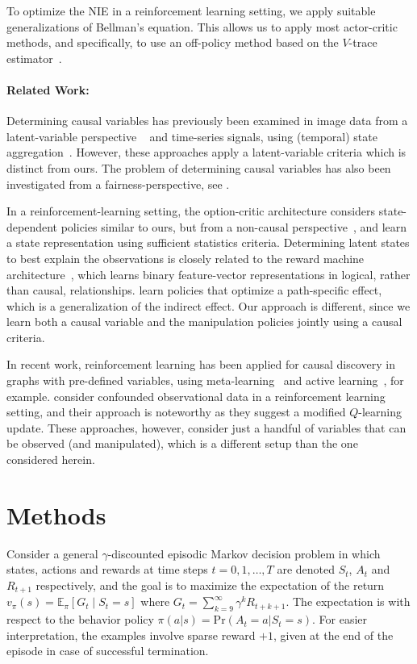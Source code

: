 \documentclass[letterpaper]{article} %
\newcommand{\EE}{\mathbb{E}}
\newcommand{\NIE}{\textrm{NIE}\xspace}
\begin{document}
	To optimize the \NIE in a reinforcement learning setting, we apply suitable generalizations of Bellman's equation. This allows us to apply most actor-critic methods, and specifically, to use an off-policy method based on the $V$-trace estimator~\cite{espeholt2018impala}.


	\paragraph{Related Work:} Determining causal variables has previously been examined in image data from a latent-variable perspective ~\cite{besserve2018counterfactuals,lopez2017discovering} and time-series signals, using (temporal) state aggregation~\cite{zhang2015multi}. However, these approaches apply a latent-variable criteria which is distinct from ours. The problem of determining causal variables has also been investigated from a fairness-perspective, see \citet{zhang2018fairness}.


	In a reinforcement-learning setting, the option-critic architecture considers state-dependent policies similar to ours, but from a non-causal perspective~\citet{bacon2017option}, and \citet{zhang2019learning} learn a state representation using sufficient statistics criteria. Determining latent states to best explain the observations is closely related to the reward machine architecture~\cite{camacho2019ltl,icarte2018using}, which learns binary feature-vector representations in logical, rather than causal, relationships. \citet{Nabi_Kanki_Shpitser_2018} learn policies that optimize a path-specific effect, which is a generalization of the indirect effect. Our approach is different, since we learn both a causal variable and the manipulation policies jointly using a causal criteria.

	In recent work, reinforcement learning has been applied for causal discovery in graphs with pre-defined variables, using meta-learning~\cite{dasgupta2019causal} and active learning~\cite{amirinezhad2020active}, for example. \citet{Wang2020ProvablyEC} consider confounded observational data in a reinforcement learning setting, and their approach is noteworthy as they suggest a modified $Q$-learning update. These approaches, however, consider just a handful of variables that can be observed (and manipulated), which is a different setup than the one considered herein.



	\section{Methods} \label{methods}
	Consider a general $\gamma$-discounted episodic Markov decision problem in which states, actions and rewards at time steps $t=0,1,\dots,T$ are denoted $S_t$, $A_t$ and $R_{t+1}$ respectively, and the goal is to maximize the expectation of the return $v_\pi(s) = \EE_{\pi}\left[ G_t \mid S_t=s \right]$ where $G_t = \sum_{k=9}^\infty \gamma^k R_{t+k+1}$. The expectation is with respect to the behavior policy $\pi(a|s) = \textrm{Pr}(A_t=a | S_t=s)$. For easier interpretation, the examples involve sparse reward $+1$, given at the end of the episode in case of successful termination.
\end{document}
